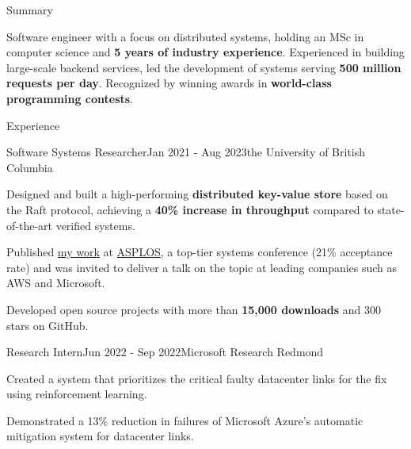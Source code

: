 \documentclass[
	10pt, %
]{resume} %
\begin{document}

\begin{rSection}{Summary}

  Software engineer with a focus on distributed systems, holding an MSc in computer
  science and \textbf{5 years of industry experience}. Experienced in building
  large-scale backend services, led the development of systems serving
  \textbf{500 million requests per day}. Recognized by winning awards in
  \textbf{world-class programming contests}.

\end{rSection}


\begin{rSection}{Experience}

  \begin{rSubsection}{Software Systems Researcher}{Jan 2021 - Aug 2023}{\textnormal{the} University of British Columbia}{}

    \item Designed and built a high-performing \textbf{distributed key-value store} based
      on the Raft protocol, achieving a \textbf{40\% increase in throughput} compared to 
      state-of-the-art verified systems.

    \item Published \href{https://dl.acm.org/doi/10.1145/3575693.3575695}{my work} 
      at \href{https://asplos-conference.org/}{ASPLOS}, a top-tier systems
      conference (21\% acceptance rate) and was
      invited to deliver a talk on the topic at leading companies such as AWS and
      Microsoft.

    \item Developed open source projects with more than \textbf{15,000 downloads} and 300 stars on GitHub.

	\end{rSubsection}

  \begin{rSubsection}{Research Intern}{Jun 2022 - Sep 2022}{Microsoft Research Redmond}{}

    \item Created a system that prioritizes the critical faulty datacenter links
      for the fix using reinforcement learning.

    \item Demonstrated a 13\% reduction in failures of Microsoft Azure's automatic
    mitigation system for datacenter links. 


\end{rSubsection}
\end{rSection}
\end{document}
